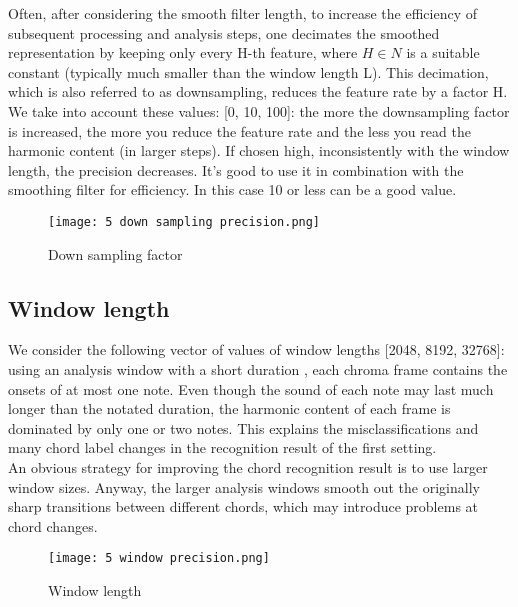 \documentclass{article}
\begin{document}
Often, after considering the smooth filter length, to increase the efficiency of subsequent processing and analysis steps, one decimates the smoothed representation by keeping only every H-th feature, where  \(H \in N\) is a suitable constant (typically much smaller than the window length L). This decimation, which is also referred to as downsampling, reduces the feature rate by a factor H.\\
We take into account these values: [0, 10, 100]: the more the downsampling factor is increased, the more you reduce the feature rate and the less you read the harmonic content (in larger steps). If chosen high, inconsistently with the window length, the precision decreases.
It's good to use it in combination with the smoothing filter for efficiency. In this case 10 or less can be a good value. 

\begin{figure}[H]
 \centering
 \texttt{[image: 5 down sampling precision.png]}
 \caption{Down sampling factor}
\end{figure}

\subsection*{Window length}

We consider the following vector of values of window lengths [2048, 8192, 32768]:  using an analysis window with a short duration , each chroma frame contains the onsets of at most one note. Even though the sound of each note may last much longer than the notated duration, the harmonic content of each frame is dominated by only one or two notes. This explains the misclassifications and many chord label changes in the recognition result of the first setting. \\
An obvious strategy for improving the chord recognition result is to use larger window sizes. Anyway, the larger analysis windows smooth out the originally sharp transitions between different chords, which may introduce problems at chord changes.\\

\begin{figure}[H]
 \centering
 \texttt{[image: 5 window precision.png]}
 \caption{Window length}
\end{figure}

\end{document}

